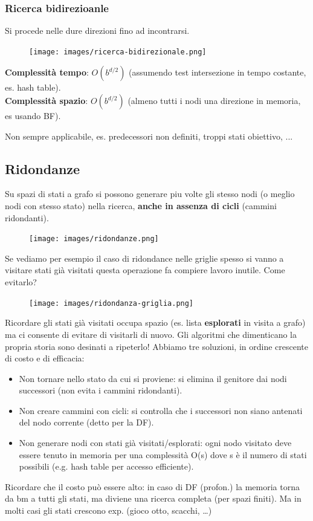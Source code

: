 \subsubsection{Ricerca bidirezioanle}
Si procede nelle dure direzioni fino ad incontrarsi.
\begin{figure}[h!]
	\centering
	\texttt{[image: images/ricerca-bidirezionale.png]}
\end{figure}

\hspace{-15pt}\textbf{Complessità tempo}: $O(b^{d/2})$ (assumendo test intersezione in tempo costante, es. hash table).\\
\textbf{Complessità spazio}: $O(b^{d/2})$ (almeno tutti i nodi una direzione in memoria, es usando BF).
\begin{note}
	Non sempre applicabile, es. predecessori non definiti, troppi stati obiettivo, ...
\end{note}

\subsection{Ridondanze}
Su spazi di stati a grafo si possono generare piu volte gli stesso nodi 
(o meglio nodi con stesso stato) nella ricerca, \textbf{anche in assenza di cicli}
(cammini ridondanti).
\begin{figure}[h!]
	\centering
	\texttt{[image: images/ridondanze.png]}
\end{figure}

\hspace{-15pt}Se vediamo per esempio il caso di ridondance nelle griglie spesso si vanno a visitare stati
già visitati questa operazione fa compiere lavoro inutile. Come evitarlo?
\begin{figure}[h!]
	\centering
	\texttt{[image: images/ridondanza-griglia.png]}
\end{figure}

\hspace{-15pt}Ricordare gli stati già visitati occupa spazio (es. lista \textbf{esplorati} in visita a grafo) ma ci consente di evitare di visitarli di nuovo.
Gli algoritmi che dimenticano la propria storia sono desinati a ripeterlo!
Abbiamo tre soluzioni, in ordine crescente di costo e di efficacia:
\begin{itemize}
	\item Non tornare nello stato da cui si proviene: si elimina il
	genitore dai nodi successori (non evita i cammini ridondanti).
	\item Non creare cammini con cicli: si controlla che i successori
	non siano antenati del nodo corrente (detto per la DF).
	\item Non generare nodi con stati già visitati/esplorati: ogni
	nodo visitato deve essere tenuto in memoria per una
	complessità O(s) dove s è il numero di stati possibili (e.g.
	hash table per accesso efficiente).
\end{itemize}
Ricordare che il costo può essere alto: in caso di DF (profon.) la
memoria torna da bm a tutti gli stati, ma diviene una ricerca
completa (per spazi finiti). Ma in molti casi gli stati crescono exp.
(gioco otto, scacchi, \dots)

